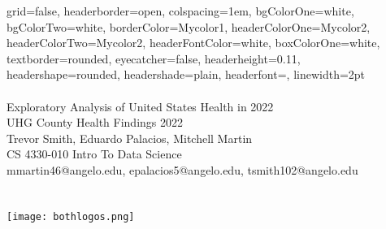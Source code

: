\documentclass[a0paper, twocolumn, landscape]{baposter}
\begin{document}

\begin{poster}
{
grid=false,
headerborder=open, %
colspacing=1em, %
bgColorOne=white, %
bgColorTwo=white, %
borderColor=Mycolor1, %
headerColorOne=Mycolor2, %
headerColorTwo=Mycolor2, %
headerFontColor=white, %
boxColorOne=white, %
textborder=rounded, %
eyecatcher=false, %
headerheight=0.11\textheight, %
headershape=rounded, %
headershade=plain,
headerfont=\Large\textsf, %
linewidth=2pt %
}
{}
%
%
{
\textsf %
{
\vspace{2.5em}\\
\\
{Exploratory Analysis of United States Health in 2022}
}
} %
{\sf\vspace{0.2em}\\
UHG County Health Findings 2022\\
\small { Trevor Smith, Eduardo Palacios, Mitchell Martin  }%
\vspace{0.1em}\\
\small{ CS 4330-010 Intro To Data Science
\vspace{0.2em}\\
mmartin46@angelo.edu, epalacios5@angelo.edu, tsmith102@angelo.edu  %
\vspace{3.9em}\\
\\
\\
}
}
{\texttt{[image: bothlogos.png]}} 


\end{poster}
\end{document}
